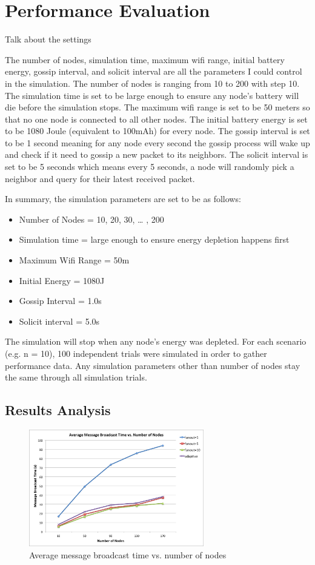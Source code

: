 \chapter{Performance Evaluation}
\label{Chapter5}

Talk about the settings


The number of nodes, simulation time, maximum wifi range, initial battery energy, gossip interval, and solicit interval are all the parameters I could control in the simulation. The number of nodes is ranging from 10 to 200 with step 10. The simulation time is set to be large enough to ensure any node's battery will die before the simulation stops. The maximum wifi range is set to be 50 meters so that no one node is connected to all other nodes. The initial battery energy is set to be 1080 Joule (equivalent to 100mAh) for every node. The gossip interval is set to be 1 second meaning for any node every second the gossip process will wake up and check if it need to gossip a new packet to its neighbors. The solicit interval is set to be 5 seconds which means every 5 seconds, a node will randomly pick a neighbor and query for their latest received packet. 

In summary, the simulation parameters are set to be as follows:
\begin{itemize}
	\item Number of Nodes = 10, 20, 30, … , 200
	\item Simulation time = large enough to ensure energy depletion happens first
	\item Maximum Wifi Range = 50m
	\item Initial Energy = 1080J
	\item Gossip Interval = 1.0s
	\item Solicit interval = 5.0s 
\end{itemize}


The simulation will stop when any node's energy was depleted. For each scenario (e.g. n = 10), 100 independent trials were simulated in order to gather performance data. Any simulation parameters other than number of nodes stay the same through all simulation trials. 


\section{Results Analysis}


\begin{figure}
	\centering
	\includegraphics[width=3in]{brTime.png}
	\caption{Average message broadcast time vs. number of nodes}
	\label{fig:brTime}
\end{figure}

